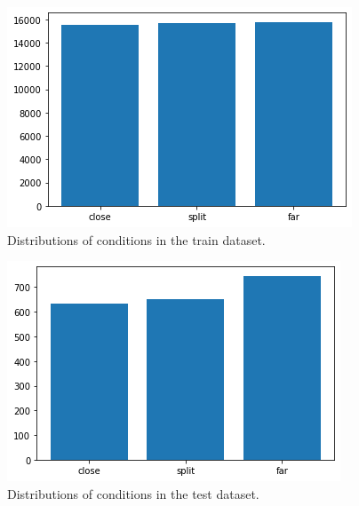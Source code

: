 \clearpage

\begin{figure}[ht]
  \centering
  \includegraphics[width=\columnwidth]{assets/trainset_conditions.png}
  \caption[Train dataset words]{Distributions of conditions in the train dataset.}
  \label{figure:trainset-conditions}
\end{figure}

\begin{figure}[ht]
  \centering
  \includegraphics[width=\columnwidth]{assets/testset_conditions.png}
  \caption[Test dataset words]{Distributions of conditions in the test dataset.}
  \label{figure:testset-conditions}
\end{figure}
